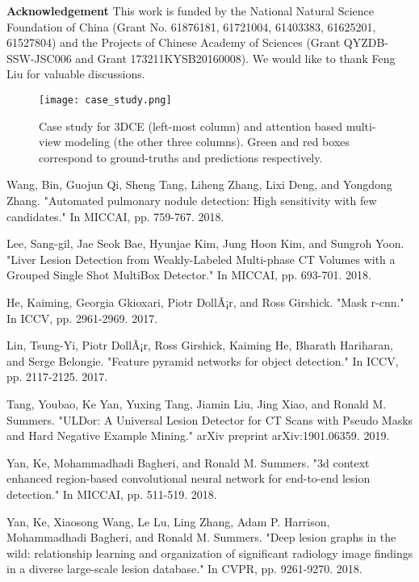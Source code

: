\documentclass[runningheads]{llncs}
\begin{document}
\noindent\textbf{Acknowledgement} This work is funded by the National Natural Science Foundation of China (Grant No. 61876181, 61721004, 61403383, 61625201, 61527804) and the Projects of Chinese Academy of Sciences (Grant QYZDB-SSW-JSC006 and Grant 173211KYSB20160008). We would like to thank Feng Liu for
valuable discussions.

\begin{figure}[!tb]
\texttt{[image: case\_study.png]}
\caption{Case study for 3DCE (left-most column) and attention based multi-view modeling (the other three columns). Green and red boxes correspond to ground-truths and predictions respectively.} \label{fig-case}
\end{figure}

\begin{thebibliography}{8}


Wang, Bin, Guojun Qi, Sheng Tang, Liheng Zhang, Lixi Deng, and Yongdong Zhang. "Automated pulmonary nodule detection: High sensitivity with few candidates." In MICCAI, pp. 759-767. 2018.

Lee, Sang-gil, Jae Seok Bae, Hyunjae Kim, Jung Hoon Kim, and Sungroh Yoon. "Liver Lesion Detection from Weakly-Labeled Multi-phase CT Volumes with a Grouped Single Shot MultiBox Detector." In MICCAI, pp. 693-701. 2018.

He, Kaiming, Georgia Gkioxari, Piotr DollÃ¡r, and Ross Girshick. "Mask r-cnn." In ICCV, pp. 2961-2969. 2017.

Lin, Tsung-Yi, Piotr DollÃ¡r, Ross Girshick, Kaiming He, Bharath Hariharan, and Serge Belongie. "Feature pyramid networks for object detection." In ICCV, pp. 2117-2125. 2017.

Tang, Youbao, Ke Yan, Yuxing Tang, Jiamin Liu, Jing Xiao, and Ronald M. Summers. "ULDor: A Universal Lesion Detector for CT Scans with Pseudo Masks and Hard Negative Example Mining." arXiv preprint arXiv:1901.06359. 2019.



Yan, Ke, Mohammadhadi Bagheri, and Ronald M. Summers. "3d context enhanced region-based convolutional neural network for end-to-end lesion detection." In MICCAI, pp. 511-519. 2018.






Yan, Ke, Xiaosong Wang, Le Lu, Ling Zhang, Adam P. Harrison, Mohammadhadi Bagheri, and Ronald M. Summers. "Deep lesion graphs in the wild: relationship learning and organization of significant radiology image findings in a diverse large-scale lesion database." In CVPR, pp. 9261-9270. 2018.



\end{thebibliography}
\end{document}
